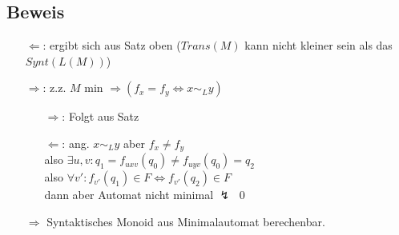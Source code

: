    \subsection{Beweis}
        \begin{itemize}
            \item[$\Leftarrow$:] ergibt sich aus Satz oben ($Trans(M)$ kann nicht kleiner sein als das $Synt(L(M))$)
            \item[$\Rightarrow$:] z.z. $M$ min $\Rightarrow (f_x=f_y\Leftrightarrow x\sim_L y)$
            \begin{itemize}
                \item[$\Rightarrow$:] Folgt aus Satz
                \item[$\Leftarrow$:] ang. $x\sim_L y$ aber $f_x\not=f_y$\\
                also $\exists u,v: q_1=f_{uxv}(q_0)\not=f_{uyv}(q_0)=q_2$\\
                also $\forall v': f_{v'}(q_1)\in F\Leftrightarrow f_{v'}(q_2)\in F$\\
                dann aber Automat nicht minimal $\lightning$ \qed
            \end{itemize}
            $\Rightarrow$ Syntaktisches Monoid aus Minimalautomat berechenbar.
        \end{itemize}
